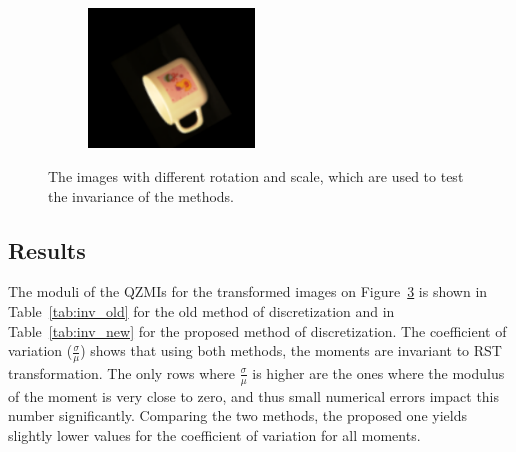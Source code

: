 \begin{figure}[tbp]
\begin{subfigure}{0.3\textwidth}
    \caption{}\label{fig:inv_img5}
	\end{subfigure}
	\begin{subfigure}{0.3\textwidth}
        \centering
    \includegraphics[width=125pt]{figures/inv_img/36x8y5r120s1_25.png}
    \caption{}\label{fig:inv_img6}
	\end{subfigure}
	\caption{The images with different rotation and scale, which are used to test the invariance of the methods.}
	\label{fig:inv_img}
\end{figure}

\subsection{Results}
The moduli of the QZMIs for the transformed images on Figure~\ref{fig:inv_img} is shown in Table~\ref{tab:inv_old} for the old method of discretization and in Table~\ref{tab:inv_new} for the proposed method of discretization. The coefficient of variation ($\frac{\sigma}{\mu}$) shows that using both methods, the moments are invariant to RST transformation. The only rows where $\frac{\sigma}{\mu}$ is higher are the ones where the modulus of the moment is very close to zero, and thus small numerical errors impact this number significantly. Comparing the two methods, the proposed one yields slightly lower values for the coefficient of variation for all moments.

